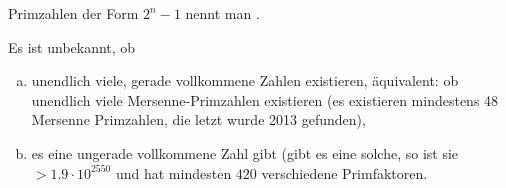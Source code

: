 \begin{df*}
	Primzahlen der Form $2^n - 1$ nennt man .
\end{df*}

\begin{nt*}
	Es ist unbekannt, ob
	\begin{enumerate}[a)]
		\item
			unendlich viele, gerade vollkommene Zahlen existieren, äquivalent: ob unendlich viele Mersenne-Primzahlen existieren (es existieren mindestens 48 Mersenne Primzahlen, die letzt wurde 2013 gefunden),
		\item
			es eine ungerade vollkommene Zahl gibt (gibt es eine solche, so ist sie $> 1.9 \cdot 10^{2550}$ und hat mindesten $420$ verschiedene Primfaktoren.
	\end{enumerate}
\end{nt*}










